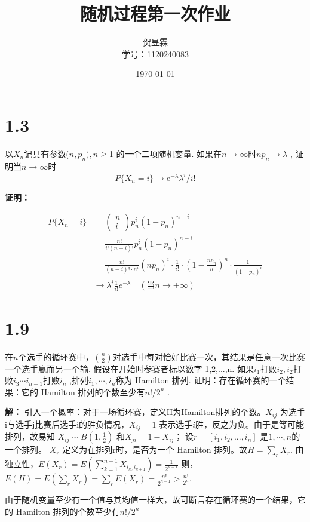 \documentclass[12pt]{article}
\title{随机过程第一次作业}
\author{贺昱霖 \\ 学号：1120240083}
\date{\today}
\begin{document}
\maketitle

\section*{1.3}
以$X_n$记具有参数($n,p_n),n\geqslant$1 的一个二项随机变量. 如果在$n\to\infty$时$np_n\to \lambda$ ,
证明当$n\to\infty$时
$$P\{X_n=i\}\to\mathrm{e}^{-\lambda}\lambda^i/i!$$

    \textbf{证明：}

$$\begin{aligned}
P\{X_{n}=i\} & =
\begin{pmatrix}
{n} \\
{i}
\end{pmatrix}p_{n}^{i}\left(1-p_{n}\right)^{n-i} \\
 & =\frac{n!}{i!(n-i)!}p_n^i(1-p_n)^{n-i} \\
 & =\frac{n!}{(n-i)!\cdot n^i}(np_n)^i\cdot\frac{1}{i!}\cdot(1-\frac{np_n}{n})^n\cdot\frac{1}{(1-p_n)^i} \\
 & \to\lambda^i\frac{1}{i!}e^{-\lambda}\quad(当n\to+\infty)
\end{aligned}$$



\section*{1.9}
在$n$个选手的循环赛中，$\binom n2$对选手中每对恰好比赛一次，其结果是任意一次比赛一个选手赢而另一个输. 假设在开始时参赛者标以数字 1,2,...,n. 如果$i_1$打败$i_2,i_2$打败$i_3\cdots i_{n-1}$打败$i_n$ ,排列$i_1,\cdots,i_n$称为 Hamilton 排列. 证明：存在循环赛的一个结果：它的 Hamilton 排列的个数至少有$n! / 2^n$ .
    
\textbf{解：}
引入一个概率：对于一场循环赛，定义H为Hamilton排列的个数。$X_{ij}$ 为选手i与选手j比赛后选手i的胜负情况，$X_{ij}=1$ 表示选手$i$胜，反之为负。由于是等可能排列，故易知 $X_{ij}\sim B(1,\frac{1}{2})$ 和$X_{ji}=1-X_{ij}$；  
设$r=[i_1,i_2,...,i_n]$ 是$1,\cdots ,n$的一个排列。  
$X_r$ 定义为在排列r时，是否为一个 Hamilton 排列。故$ H=\sum_r X_r.$  由独立性，$E(X_r)=E(\sum_{k=1}^{n-1}X_{i_k,i_{k+1}})=\frac{1}{2^{n-1}}$  
则，$E(H)=E(\sum_r X_r)=\sum_r E(X_r)=\frac{n!}{2^{n-1}}>\frac{n!}{2^n}.$

由于随机变量至少有一个值与其均值一样大，故可断言存在循环赛的一个结果，它的 Hamilton 排列的个数至少有$n! / 2^n$ 
\end{document}
